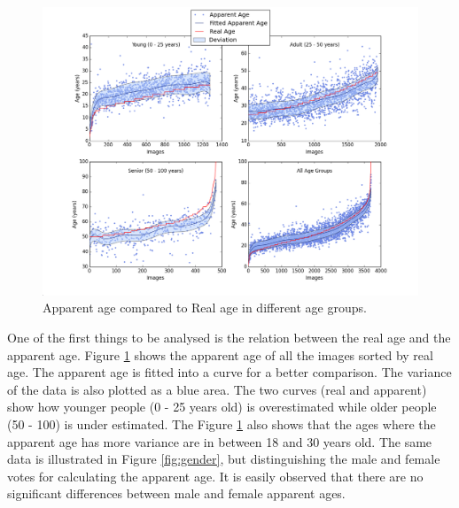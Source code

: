 \begin{figure}[h!]
	\centering
	\includegraphics[width=\textwidth]{figures/Labels_across_img}
	\caption{Apparent age compared to Real age in different age groups.}
	\label{fig:apparent_real}
\end{figure}

One of the first things to be analysed is the relation between the real age and the apparent age. Figure \ref{fig:apparent_real} shows the apparent age of all the images sorted by real age. The apparent age is fitted into a curve for a better comparison. The variance of the data is also plotted as a blue area. The two curves (real and apparent) show how younger people (0 - 25 years old) is overestimated while older people (50 - 100) is under estimated. The Figure \ref{fig:apparent_real} also shows that the ages where the apparent age has more variance are in between 18 and 30 years old. The same data is illustrated in Figure \ref{fig:gender}, but distinguishing the male and female votes for calculating the apparent age. It is easily observed that there are no significant differences between male and female apparent ages.



